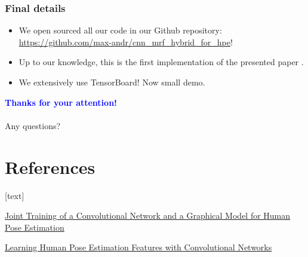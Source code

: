 \documentclass{beamer}
\newcommand\blue[1]{\textcolor{blue}{\textbf{#1}}}
\begin{document}
    \begin{frame}[t]
        \frametitle{Final details}
        \begin{itemize}
            \item We open sourced all our code in our Github repository: \url{https://github.com/max-andr/cnn_mrf_hybrid_for_hpe}! \\
            \item Up to our knowledge, this is the first implementation of the presented paper \cite{cnn_pgm_for_hpe}.
            \item We extensively use TensorBoard! Now small demo.
        \end{itemize}
    \end{frame}


	\begin{frame}[plain,c]
		\begin{center}
			\Huge \blue{Thanks for your attention!} \\ \ \\
			Any questions? \\
		\end{center}
	\end{frame}
	
	
	\section*{References}
	\begin{thebibliography}{}
		
		\href{https://arxiv.org/abs/1406.2984}
		{Joint Training of a Convolutional Network and a Graphical Model for Human Pose Estimation}

		\href{https://arxiv.org/abs/1312.7302}
		{Learning Human Pose Estimation Features with Convolutional Networks}
	\end{thebibliography} 
\end{document}
